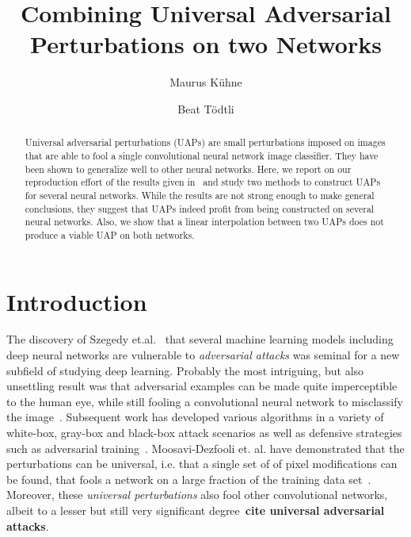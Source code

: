 \documentclass[runningheads]{llncs}
\begin{document}
%
\title{Combining Universal Adversarial Perturbations on two Networks}%
%
%
\author{Maurus K\"uhne \and
Beat Tödtli} %
%
%
%
\maketitle              %
%
\begin{abstract}
Universal adversarial perturbations (UAPs) are small perturbations imposed on images that are able to fool a single convolutional neural network image classifier. They have been shown to generalize well to other neural networks. Here, we report on our reproduction effort of the results given in~\cite{moosavi-dezfooli_universal_2017} and study two methods to construct UAPs for several neural networks. While the results are not strong enough to make general conclusions, they suggest that UAPs indeed profit from being constructed on several neural networks. Also, we show that a linear interpolation between two UAPs does not produce a viable UAP on both networks.
\end{abstract}
%
%
%

\section{Introduction}
The discovery of Szegedy et.al.~\cite{Szegedy_2014} that several machine learning models including deep neural networks are vulnerable to \emph{adversarial attacks} was seminal for a new subfield of studying deep learning. Probably the most intriguing, but also unsettling result was that adversarial examples can be made quite imperceptible to the human eye, while still fooling a convolutional neural network to misclassify the image~\cite{goodfellow_2014}. Subsequent work has developed various algorithms in a variety of white-box, gray-box and black-box attack scenarios as well as defensive strategies such as adversarial training~\cite{REN2020346}. Moosavi-Dezfooli et. al. have demonstrated that the perturbations can be universal, i.e. that a single set of of pixel modifications can be found, that fools a network on a large fraction of the training data set~\cite{moosavi-dezfooli_universal_2017}. Moreover, these \emph{universal perturbations} also fool other convolutional networks, albeit to a lesser but still very significant degree~{\bf cite universal adversarial attacks}. 
\end{document}
